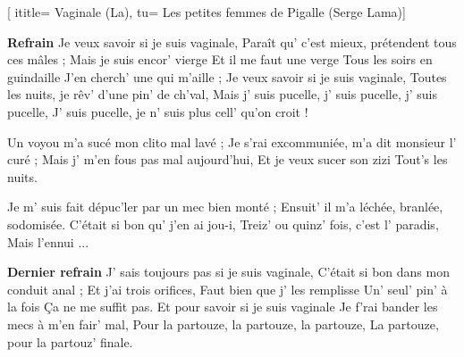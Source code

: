  [
ititle= {Vaginale (La)},
tu= {Les petites femmes de Pigalle (Serge Lama)}]


\beginchorus
\textbf {Refrain}
Je veux savoir si je suis vaginale,
Paraît qu' c'est mieux, prétendent tous ces mâles ;
Mais je suis encor' vierge
Et il me faut une verge
Tous les soirs en guindaille
J'en cherch' une qui m'aille ;
Je veux savoir si je suis vaginale,
Toutes les nuits, je rêv' d'une pin' de ch'val,
Mais j' suis pucelle, j' suis pucelle, j' suis pucelle,
J' suis pucelle, je n' suis plus cell' qu'on croit !
\endchorus

\beginverse
Un voyou m'a sucé mon clito mal lavé ;
Je s'rai excommuniée, m'a dit monsieur l' curé ;
Mais j' m'en fous pas mal aujourd'hui,
Et je veux sucer son zizi
Tout's les nuits.
\endverse

\beginverse
Je m' suis fait dépuc'ler par un mec bien monté ;
Ensuit' il m'a léchée, branlée, sodomisée.
C'était si bon qu' j'en ai jou-i,
Treiz' ou quinz' fois, c'est l' paradis,
Mais l'ennui ...
\endverse

\beginchorus
\textbf {Dernier refrain}
J' sais toujours pas si je suis vaginale,
C'était si bon dans mon conduit anal ;
Et j'ai trois orifices,
Faut bien que j' les remplisse
Un' seul' pin' à la fois
Ça ne me suffit pas.
Et pour savoir si je suis vaginale
Je f'rai bander les mecs à m'en fair' mal,
Pour la partouze, la partouze, la partouze,
La partouze, pour la partouz' finale.
\endchorus

\endsong